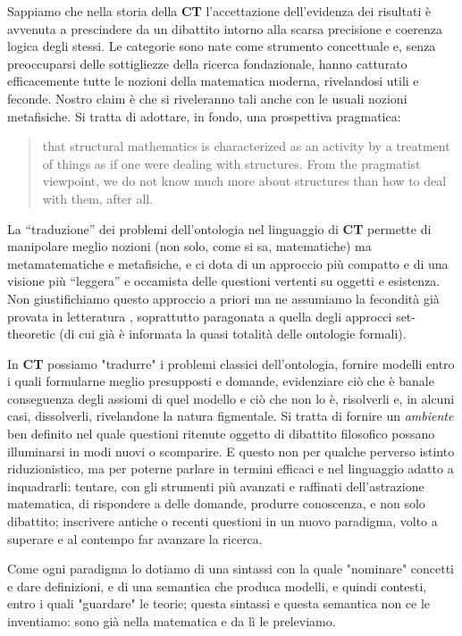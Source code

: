 \documentclass[a4paper, 11pt]{article}
\begin{document}
	  Sappiamo che nella storia della \textbf{CT} l'accettazione dell'evidenza dei risultati è avvenuta a prescindere da un dibattito intorno alla scarsa precisione e coerenza logica degli stessi. Le categorie sono nate come strumento concettuale e, senza preoccuparsi delle sottigliezze della ricerca fondazionale, hanno catturato efficacemente tutte le nozioni della matematica moderna, rivelandosi utili e feconde. Nostro claim è che si riveleranno tali anche con le usuali nozioni metafisiche. Si tratta di adottare, in fondo, una prospettiva pragmatica:
	  \begin{quotation}
	  	that structural mathematics is characterized as an activity by a treatment of things as if one were dealing with structures. From the pragmatist viewpoint, we do not know much more about structures than how to deal with them, after all.
	  \end{quotation}
	  La ``traduzione'' dei problemi dell'ontologia nel linguaggio di \textbf{CT} permette di manipolare meglio nozioni (non solo, come si sa, matematiche) ma metamatematiche e metafisiche, e ci dota di un approccio più compatto e di una visione più ``leggera'' e occamista delle questioni vertenti su oggetti e esistenza. Non giustifichiamo questo approccio a priori ma ne assumiamo la fecondità già provata in letteratura \endfo, soprattutto paragonata a quella degli approcci set-theoretic (di cui già è informata la quasi totalità delle ontologie formali).
	 
	 In \textbf{CT} possiamo "tradurre" i problemi classici dell'ontologia, fornire modelli entro i quali formularne meglio presupposti e domande, evidenziare ciò che è banale conseguenza degli assiomi di quel modello e ciò che non lo è, risolverli e, in alcuni casi, dissolverli, rivelandone la natura figmentale. Si tratta di fornire un \emph{ambiente} ben definito nel quale questioni ritenute oggetto di dibattito filosofico possano illuminarsi in modi nuovi o scomparire. E questo non per qualche perverso istinto riduzionistico, ma per poterne parlare in termini efficaci e nel linguaggio adatto a inquadrarli: tentare, con gli strumenti più avanzati e raffinati dell'astrazione matematica, di rispondere a delle domande, produrre conoscenza, e non solo dibattito; inscrivere antiche o recenti questioni in un nuovo paradigma, volto a superare e al contempo far avanzare la ricerca.
	
	Come ogni paradigma lo dotiamo di una sintassi con la quale "nominare" concetti e dare definizioni, e di una semantica che produca modelli, e quindi contesti, entro i quali "guardare" le teorie; questa sintassi e questa semantica non ce le inventiamo: sono già nella matematica e da lì le preleviamo. 
	
\end{document}
